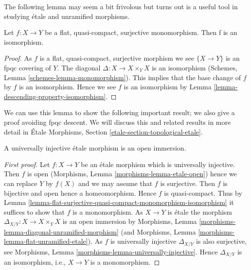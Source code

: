 \noindent
The following lemma may seem a bit frivolous but turns out is a useful
tool in studying \'etale and unramified morphisms.

\begin{lemma}
\label{lemma-flat-surjective-quasi-compact-monomorphism-isomorphism}
Let $f : X \to Y$ be a flat, quasi-compact, surjective monomorphism.
Then f is an isomorphism.
\end{lemma}

\begin{proof}
As $f$ is a flat, quasi-compact, surjective morphism
we see $\{X \to Y\}$ is an fpqc covering of $Y$.
The diagonal $\Delta : X \to X \times_Y X$ is an isomorphism
(Schemes, Lemma \ref{schemes-lemma-monomorphism}).
This implies that the base change of $f$ by $f$ is an
isomorphism. Hence we see $f$ is an isomorphism by
Lemma \ref{lemma-descending-property-isomorphism}.
\end{proof}

\noindent
We can use this lemma to show the following important result; we also
give a proof avoiding fpqc descent.
We will discuss this and related results in more detail in
\'Etale Morphisms, Section \ref{etale-section-topological-etale}.

\begin{lemma}
\label{lemma-universally-injective-etale-open-immersion}
A universally injective \'etale morphism is an open immersion.
\end{lemma}

\begin{proof}[First proof]
Let $f : X \to Y$ be an \'etale morphism which is universally injective.
Then $f$ is open
(Morphisms, Lemma \ref{morphisms-lemma-etale-open})
hence we can replace $Y$ by $f(X)$ and we may assume that $f$ is surjective.
Then $f$ is bijective and open hence a homeomorphism. Hence $f$ is
quasi-compact. Thus by
Lemma \ref{lemma-flat-surjective-quasi-compact-monomorphism-isomorphism}
it suffices to show that $f$ is a monomorphism. As $X \to Y$ is \'etale
the morphism $\Delta_{X/Y} : X \to X \times_Y X$ is an open immersion by
Morphisms, Lemma \ref{morphisms-lemma-diagonal-unramified-morphism}
(and
Morphisms, Lemma \ref{morphisms-lemma-flat-unramified-etale}).
As $f$ is universally injective $\Delta_{X/Y}$ is also surjective, see
Morphisms, Lemma \ref{morphisms-lemma-universally-injective}.
Hence $\Delta_{X/Y}$ is an isomorphism, i.e., $X \to Y$ is a monomorphism.
\end{proof}

